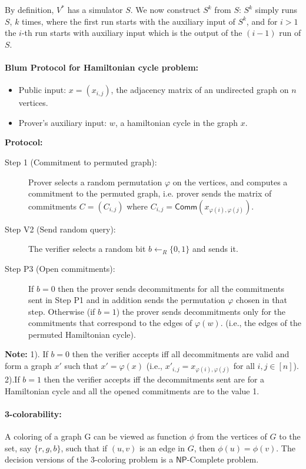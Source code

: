 \documentclass[11pt]{article}
\newcommand{\class}[1]{{\ensuremath{\mathsf{#1}}}}
\newcommand{\np}{\class{NP}}
\newcommand{\zo}{\{0, 1\}}
\begin{document}
By definition, $V^*$ has a simulator $S$. We now construct $S^k$ from $S$: $S^k$ simply runs $S$, $k$ times, where the first run starts with the auxiliary input of $S^k$, and for $i > 1$ the $i$-th run starts with auxiliary input which is the output of the $(i-1)$ run of $S$.

\paragraph{Blum Protocol for Hamiltonian cycle problem: }
\begin{itemize}
\item Public input: $x = (x_{i,j})$, the adjacency matrix of an undirected graph on $n$ vertices.
\item Prover’s auxiliary input: $w$, a hamiltonian cycle in the graph $x$.
\end{itemize}
\textbf{Protocol:}
\begin{description}
\item[Step 1 (Commitment to permuted graph):] Prover selects a random permutation $\varphi$ on the vertices, and computes a commitment to the permuted graph, i.e. prover sends the matrix of commitments $C = (C_{i,j})$ where $C_{i,j} = \class{Comm}(x_{\varphi(i),\varphi(j)})$.
\item[Step V2 (Send random query):] The verifier selects a random bit $b \leftarrow_R \zo$ and sends it.
\item[Step P3 (Open commitments):] If $b = 0$ then the prover sends decommitments for all the commitments sent in Step P1 and in addition sends the permutation $\varphi$ chosen in that step. Otherwise (if $b = 1$) the prover sends decommitments only for the commitments that correspond to the edges of $\varphi(w)$. (i.e., the edges of the permuted Hamiltonian cycle).
\end{description}
\textbf{Note: }1). If $b = 0$ then the verifier accepts iff all decommitments are valid and form a graph $x'$ such that $x' = \varphi(x)$ (i.e., $x'_{i,j} = x_{\varphi(i),\varphi(j)}$ for all $i, j \in [n]$). \\
2).If $b = 1$ then the verifier accepts iff the decommitments sent are for a Hamiltonian cycle and all the opened commitments are to the value 1.

\paragraph{3-colorability:} 
A coloring of a graph G can be viewed as function $\phi$ from the vertices of $G$ to the set, say $\{r, g, b\}$, such that if $(u, v)$ is an edge in $G$, then $\phi(u)= \phi(v)$. The decision versions of the 3-coloring problem is a $\np$-Complete problem.
\end{document}
